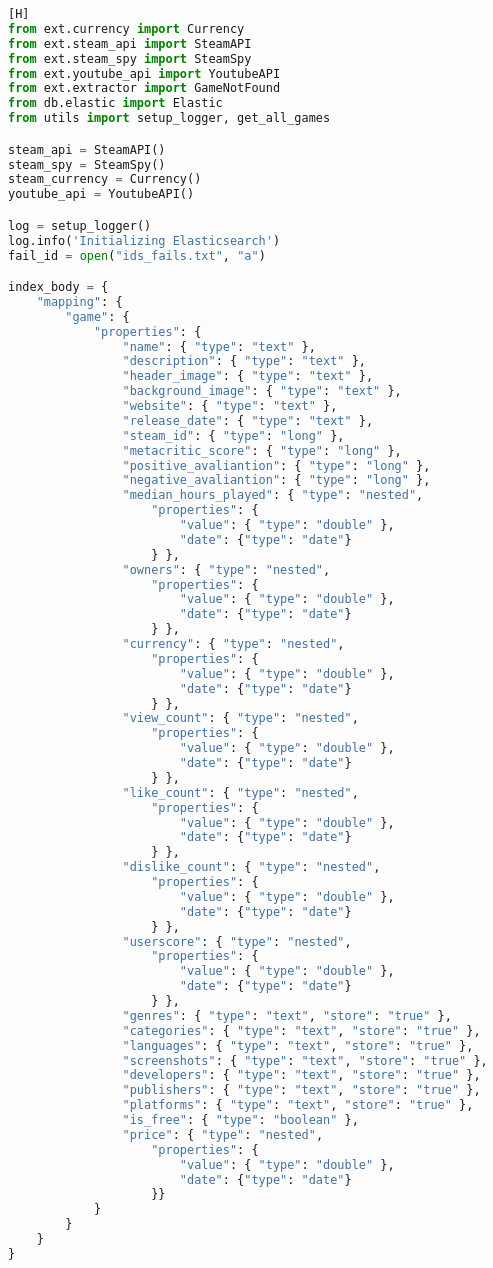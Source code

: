 \begin{lstlisting}[language={Python}, caption = {Código da \textit{\textbf{Main}}}, label = {code:main}] [H]
from ext.currency import Currency
from ext.steam_api import SteamAPI
from ext.steam_spy import SteamSpy
from ext.youtube_api import YoutubeAPI
from ext.extractor import GameNotFound
from db.elastic import Elastic
from utils import setup_logger, get_all_games

steam_api = SteamAPI()
steam_spy = SteamSpy()
steam_currency = Currency()
youtube_api = YoutubeAPI()

log = setup_logger()
log.info('Initializing Elasticsearch')
fail_id = open("ids_fails.txt", "a")

index_body = {
	"mapping": {
		"game": {
			"properties": {
				"name": { "type": "text" },
				"description": { "type": "text" },
				"header_image": { "type": "text" },
				"background_image": { "type": "text" },
				"website": { "type": "text" },
				"release_date": { "type": "text" },
				"steam_id": { "type": "long" },
				"metacritic_score": { "type": "long" },
				"positive_avaliantion": { "type": "long" },
				"negative_avaliantion": { "type": "long" },
				"median_hours_played": { "type": "nested",
					"properties": {
						"value": { "type": "double" },
						"date": {"type": "date"}
					} },
				"owners": { "type": "nested",
					"properties": {
						"value": { "type": "double" },
						"date": {"type": "date"}
					} },
				"currency": { "type": "nested",
					"properties": {
						"value": { "type": "double" },
						"date": {"type": "date"}
					} },
				"view_count": { "type": "nested",
					"properties": {
						"value": { "type": "double" },
						"date": {"type": "date"}
					} },
				"like_count": { "type": "nested",
					"properties": {
						"value": { "type": "double" },
						"date": {"type": "date"}
					} },
				"dislike_count": { "type": "nested",
					"properties": {
						"value": { "type": "double" },
						"date": {"type": "date"}
					} },
				"userscore": { "type": "nested",
					"properties": {
						"value": { "type": "double" },
						"date": {"type": "date"}
					} },
				"genres": { "type": "text", "store": "true" },
				"categories": { "type": "text", "store": "true" },
				"languages": { "type": "text", "store": "true" },
				"screenshots": { "type": "text", "store": "true" },
				"developers": { "type": "text", "store": "true" },
				"publishers": { "type": "text", "store": "true" },
				"platforms": { "type": "text", "store": "true" },
				"is_free": { "type": "boolean" },
				"price": { "type": "nested",
					"properties": {
						"value": { "type": "double" },
						"date": {"type": "date"}
					}}
			}
		}
	}
}


\end{lstlisting}
